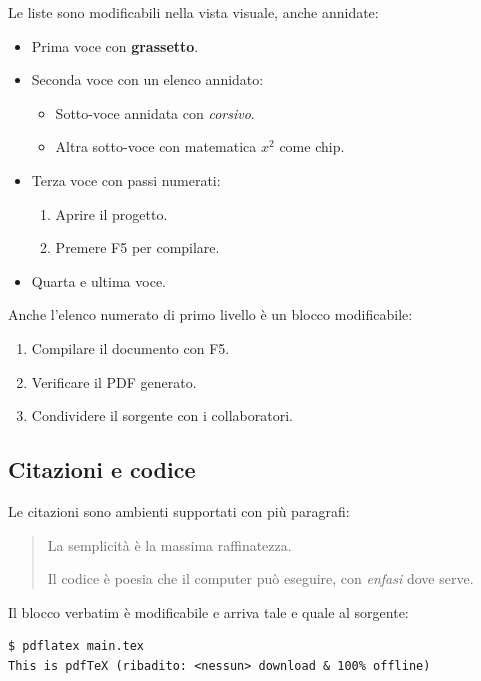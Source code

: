 \documentclass[a4paper,11pt]{article}
\begin{document}
\label{sec:liste}

Le liste sono modificabili nella vista visuale, anche annidate:

\begin{itemize}
  \item Prima voce con \textbf{grassetto}.
  \item Seconda voce con un elenco annidato:
    \begin{itemize}
      \item Sotto-voce annidata con \emph{corsivo}.
      \item Altra sotto-voce con matematica $x^2$ come chip.
    \end{itemize}
  \item Terza voce con passi numerati:
    \begin{enumerate}
      \item Aprire il progetto.
      \item Premere F5 per compilare.
    \end{enumerate}
  \item Quarta e ultima voce.
\end{itemize}

Anche l'elenco numerato di primo livello è un blocco modificabile:

\begin{enumerate}
  \item Compilare il documento con F5.
  \item Verificare il PDF generato.
  \item Condividere il sorgente con i collaboratori.
\end{enumerate}

\subsection{Citazioni e codice}

Le citazioni sono ambienti supportati con più paragrafi:

\begin{quote}
La semplicità è la massima raffinatezza.

Il codice è poesia che il computer può eseguire, con \emph{enfasi} dove serve.
\end{quote}

Il blocco verbatim è modificabile e arriva tale e quale al sorgente:

\begin{verbatim}
$ pdflatex main.tex
This is pdfTeX (ribadito: <nessun> download & 100% offline)
\end{verbatim}
\end{document}
